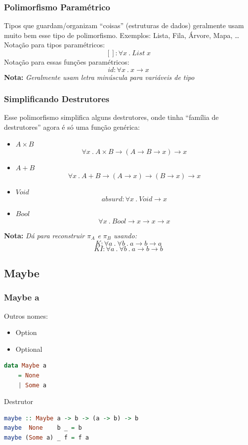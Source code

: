 \documentclass{beamer}
\newcommand{\nota}[1]{\textbf{Nota:}\textit{ #1}}
\renewcommand{\d}{\:.\:}
\begin{document}
\begin{frame}
    \frametitle{Polimorfismo Paramétrico}
    Tipos  que guardam/organizam ``coisas''
    (estruturas de dados) geralmente usam
    muito bem esse tipo de polimorfismo.
    Exemplos: Lista, Fila, Árvore, Mapa, \dots
    \vfill
    Notação para tipos paramétricos:
    \[
        [] : \forall x \d List \; x
    \]
    \vfill
    Notação para essas funções paramétricos:
    \[
        id : \forall x \d x \to x
    \]
    \vfill
    \nota{Geralmente usam letra minúscula para variáveis de tipo}
\end{frame}

\begin{frame}
    \frametitle{Simplificando Destrutores}
    Esse polimorfismo simplifica alguns destrutores,
    onde tinha ``família de destrutores''
    agora é só uma função genérica:
    \begin{itemize}
        \item \(A \times B\)
            \[
                \forall x \d A \times B \to (A \to B \to x) \to x
            \]
            \vfill
        \item \(A + B\)
            \[
                \forall x \d A + B \to (A \to x) \to (B \to x) \to x
            \]
            \vfill
        \item \(Void\)
            \[
                absurd: \forall x \d Void \to x
            \]
            \vfill
        \item \(Bool\)
            \[
                \forall x \d Bool \to x \to x \to x
            \]
    \end{itemize}
    \nota{Dá para reconstruir \(\pi_A\) e \(\pi_B\) usando:
        \[
            K : \forall a \d \forall b \d a \to b \to a
        \] \[
            KI : \forall a \d \forall b \d a \to b \to b
        \]}
\end{frame}

\subsection{Maybe}
\begin{frame}[fragile]
    \frametitle{Maybe a}
    Outros nomes:
    \begin{itemize}
        \item Option
        \item Optional
    \end{itemize}
    \vfill
    \begin{lstlisting}[language=Haskell]
data Maybe a
    = None
    | Some a
    \end{lstlisting}
    \vfill
    Destrutor
    \begin{lstlisting}[language=Haskell]
maybe :: Maybe a -> b -> (a -> b) -> b
maybe  None    b _ = b
maybe (Some a) _ f = f a
    \end{lstlisting}
\end{frame}
\end{document}
